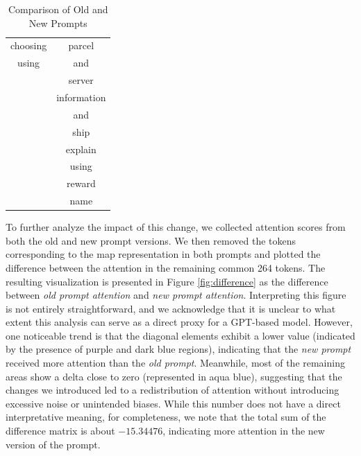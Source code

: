 \begin{table}[ht]
\begin{tabular}{|c|c|}
    choosing            & parcel              \\
    using               & and                 \\
                        & server              \\
                        & information         \\
                        & and                 \\
                        & ship                \\
                        & explain             \\
                        & using               \\
                        & reward              \\
                        & name                \\
    \hline
  \end{tabular}
  \caption{Comparison of Old and New Prompts}
  \label{tab:prompt_comparison}
\end{table}

To further analyze the impact of this change, we collected attention scores from
both the old and new prompt versions. We then removed the tokens corresponding
to the map representation in both prompts and plotted the difference between the
attention in the remaining common 264 tokens. The resulting visualization is presented
in Figure \ref{fig:difference} as the difference between \emph{old prompt
attention} and \emph{new prompt attention}. Interpreting this figure is not
entirely straightforward, and we acknowledge that it is unclear to what extent this
analysis can serve as a direct proxy for a GPT-based model. However, one noticeable
trend is that the diagonal elements exhibit a lower value (indicated by the
presence of purple and dark blue regions), indicating that the \emph{new prompt}
received more attention than the \emph{old prompt}. Meanwhile, most of the
remaining areas show a delta close to zero (represented in aqua blue), suggesting
that the changes we introduced led to a redistribution of attention without introducing
excessive noise or unintended biases. While this number does not have a direct
interpretative meaning, for completeness, we note that the total sum of the
difference matrix is about $- 15.34476$, indicating more attention in the new version
of the prompt.

